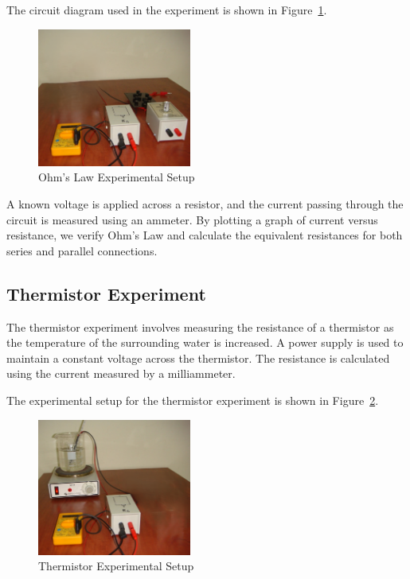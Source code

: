 \documentclass[journal]{IEEEtran}
\begin{document}
The circuit diagram used in the experiment is shown in Figure~\ref{fig:ohmslaw}.

\begin{figure}[H]
    \centering
    \includegraphics[width=0.45\textwidth]{IMAGES/Ohms_Law_Setup_only.png} %
    \caption{Ohm's Law Experimental Setup\cite{lab_manual}}
    \label{fig:ohmslaw}
\end{figure}

A known voltage is applied across a resistor, and the current passing through the circuit is measured using an ammeter. By plotting a graph of current versus resistance, we verify Ohm’s Law and calculate the equivalent resistances for both series and parallel connections.

\subsection{Thermistor Experiment}
The thermistor experiment involves measuring the resistance of a thermistor as the temperature of the surrounding water is increased. A power supply is used to maintain a constant voltage across the thermistor. The resistance is calculated using the current measured by a milliammeter. 

The experimental setup for the thermistor experiment is shown in Figure~\ref{fig:thermistor}.

\begin{figure}[H]
    \centering
    \includegraphics[width=0.45\textwidth]{IMAGES/Thermistor_Setup.png} %
    \caption{Thermistor Experimental Setup\cite{lab_manual}}
    \label{fig:thermistor}
\end{figure}
\end{document}
